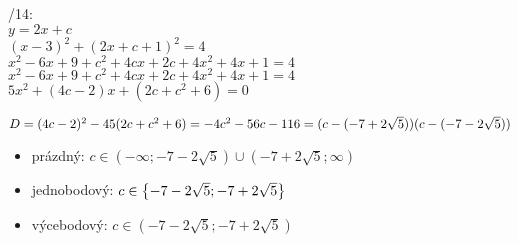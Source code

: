 /14:\\
$y= 2x + c$\\
$ (x-3)^2 + (2x + c +1)^2 = 4$\\
$ x^2-6x+9 + c^2 + 4cx + 2c + 4x^2 + 4x + 1 = 4$\\
$ x^2-6x+9 + c^2 + 4cx + 2c + 4x^2 + 4x + 1 = 4$\\
$ 5 x^2 +(4c-2)x + (2c+c^2+6) =0$

$D = (4c-2)^2-4\*5 ( 2c+c^2 + 6) = -4 c^2 - 56 c - 116 = (c-(-7+2\sqrt 5))(c-(-7-2 \sqrt 5))$

\begin{itemize}
	\item prázdný: $c \in (-\infty;-7-2\sqrt 5) \cup (-7+2\sqrt 5;\infty)$
	\item jednobodový: $c \in \left\{{-7-2\sqrt 5 ; -7+2\sqrt 5}\right\}$
	\item výcebodový: $c \in (-7-2\sqrt 5 ; -7+2\sqrt 5)$
\end{itemize}

\EndDoc
